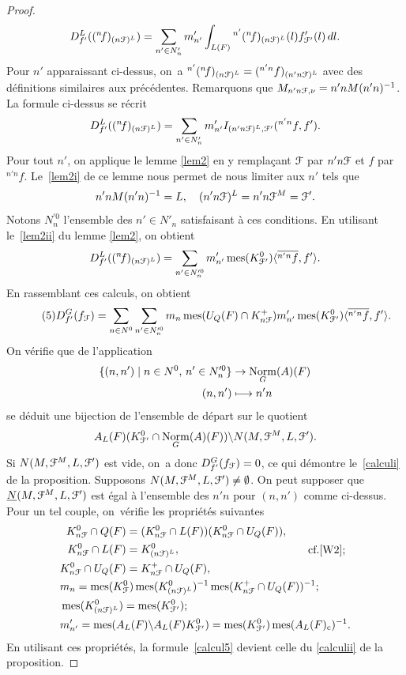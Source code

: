\documentclass[11pt]{article}
\newcommand{\cf}{cf.\xspace}
\numberwithin{equation}{section}\providecommand{\og}{«\,}\providecommand{\fg}{\,»}
\let\mathcal \EuScript
\let\<\langle
\let\>\rangle
\let\sep\mid
\newcommand\mto{\mathchoice{\longmapsto}{\mapsto}{\mapsto}{\mapsto}}
\newcommand{\nf}{{}^n\!f}
\newcommand{\rc}{\mathrm{c}}
\DeclareMathOperator{\mes}{mes}
\DeclareMathOperator{\Norm}{Norm}
\newcommand{\cF}{\mathcal{F}}
\theoremstyle{plain}
\theoremstyle{definition}
\begin{document}
\begin{proof}
\[
D_{f'}^L((\nf)_{(n\cF)^L})=\sum_{n'\in N'_{n}}m'_{n'}\int_{L(F)}{^{n'}(\nf)_{(n\cF)^L}}(l)f'_{\cF'}(l)\,dl.
\]
Pour $n'$ apparaissant ci-dessus, on~a $^{n'}(\nf)_{(n\cF)^L}=(^{n'n}f)_{(n'n\cF)^L}$ avec des définitions similaires aux précédentes. Remarquons que $M_{n'n\cF,\nu}=n'nM(n'n)^{-1}$. La formule ci-dessus se récrit
\[
D_{f'}^L((\nf)_{(n\cF)^L})=\sum_{n'\in N'_{n}}m'_{n'}I_{(n'n\cF)^L,\cF'}(^{n'n}f,f').
\]
Pour tout $n'$, on applique le lemme \ref{lem2} en y remplaçant $\cF$ par $n'n\cF$ et $f$ par $^{n'n}f$. Le~\eqref{lem2i} de ce lemme nous permet de nous limiter aux $n'$ tels que
\[
n'nM(n'n)^{-1}=L,\quad (n'n\cF)^L=n'n\cF^M=\cF'.
\]
Notons $N_{n}^{\prime0}$ l'ensemble des $n'\in N'_{n}$ satisfaisant à ces conditions. En utilisant le~\eqref{lem2ii} du lemme \ref{lem2}, on obtient
\[
D_{f'}^L((\nf)_{(n\cF)^L})=\sum_{n'\in N^{\prime0}_{n}}m'_{n'}\mes(K_{\cF'}^0)\<\overline{^{n'n}f},f'\>.
\]
En rassemblant ces calculs, on obtient
\begin{equation}\tag{5}\label{calcul5}
D^G_{f'}(f_{\cF})= \sum_{n\in N^0}\sum_{n'\in N_{n}^{\prime0}}m_{n}\mes(U_{Q}(F)\cap K_{n\cF}^+) m'_{n'}\mes(K_{\cF'}^0)\<\overline{^{n'n}f},f'\>.
\end{equation}
On vérifie que de l'application
\begin{align*}
\{(n,n')\sep n\in N^0,\, n'\in N_{n}^{\prime0}\}&\to \Norm_{G}(A)(F)\\ (n,n')&\mto n'n
\end{align*}
se déduit une bijection de l'ensemble de départ sur le quotient
\[
A_{L}(F)(K_{\cF'}^0\cap \Norm_{G}(A)(F))\backslash N(M,\cF^{M},L,\cF') .
\]
Si $N(M,\cF^{M},L,\cF')$ est vide, on~a donc $D^G_{f'}(f_{\cF})=0$, ce qui démontre le~\eqref{calculi} de la proposition. Supposons $N(M,\cF^M,L,\cF')\neq\emptyset$. On peut supposer que $\underline{N}(M,\cF^M,L,\cF')$ est égal à l'ensemble des $n'n$ pour $(n,n')$ comme ci-dessus.
Pour un tel couple, on~vérifie les propriétés suivantes
\begin{align*}
&
\begin{aligned}
K_{n\cF}^0\cap Q(F)&=(K_{n\cF}^0\cap L(F))(K_{n\cF}^0\cap U_{Q}(F)),\\
K_{n\cF}^0\cap L(F)&=K_{(n\cF)^L}^0,\\
K_{n\cF}^0\cap U_{Q}(F)&=K_{n\cF}^+\cap U_{Q}(F),
\end{aligned}
\qquad\text{\cf \cite[Lem.\,6]{W2};}
\\
&m_{n}=\mes(K_{\cF}^0)\mes(K_{(n\cF)^L}^0)^{-1}\mes(K_{n\cF}^+\cap U_{Q}(F))^{-1};
\\
&\mes(K_{(n\cF)^L}^0)=\mes(K_{\cF'}^0);
\\
&m'_{n'}=\mes(A_{L}(F)\backslash A_{L}(F)K_{\cF'}^0)=\mes(K_{\cF'}^0)\mes(A_{L}(F)_{\rc})^{-1}.
\end{align*}
En utilisant ces propriétés, la formule~\eqref{calcul5} devient celle du \eqref{calculii} de la proposition.
\end{proof}
\end{document}
